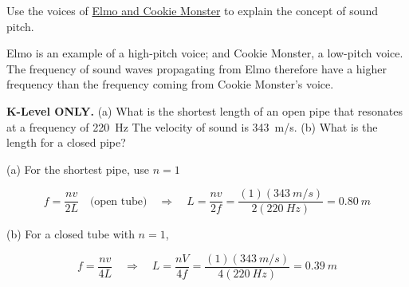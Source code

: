 \documentclass[answers]{exam}
\begin{document}
\begin{questions}
\question
Use the voices of \href{https://youtu.be/DgG6tXHru8c?si=Jcyk5kerVd4VnxNU}{Elmo and Cookie Monster} to explain the concept of sound pitch.

\ifprintanswers
{\color{red}
Elmo is an example of a high-pitch voice; and Cookie Monster, a low-pitch voice. The frequency of sound waves propagating from Elmo therefore have a higher frequency than the frequency coming from Cookie Monster's voice.
}
\fi

\fillwithlines{2cm}

\question
\textbf{K-Level ONLY.} (a) What is the shortest length of an open pipe that resonates at a frequency of \SI{220}{Hz} The velocity of sound is \SI{343}{m/s}. (b) What is the length for a closed pipe?

\begin{solutionorbox}[4cm]

(a) For the shortest pipe, use $n=1$

\begin{equation*}
    f = \frac{nv}{2L} \quad \text{(open tube)} \quad \Rightarrow \quad 
    L = \frac{nv}{2f} = \frac{(1)(\SI{343}{m/s})}{2(\SI{220}{Hz})} = \boxed{\SI{0.80}{m}}
\end{equation*}

(b) For a closed tube with $n = 1$,

\begin{equation*}
    f = \frac{nv}{4L} \quad \Rightarrow \quad 
    L = \frac{nV}{4f} = \frac{(1)(\SI{343}{m/s})}{4(\SI{220}{Hz})} = \boxed{\SI{0.39}{m}}
\end{equation*}
\end{solutionorbox}












\end{questions}
\end{document}

